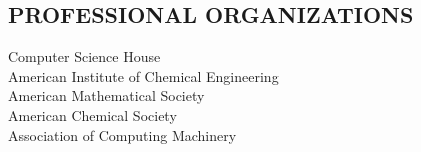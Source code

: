 \documentclass[line,margin]{res}
\begin{document}
\begin{resume}
\section{PROFESSIONAL ORGANIZATIONS}             
            	Computer Science House\\
                American Institute of Chemical Engineering\\
				American Mathematical Society\\
				American Chemical Society\\
				Association of Computing Machinery\\


\end{resume}
\end{document}
